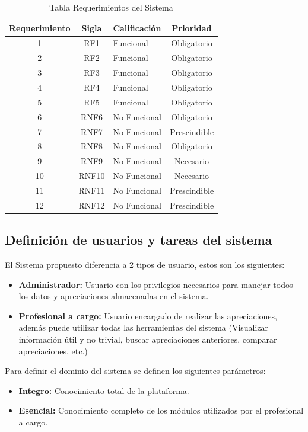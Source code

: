 \begin{table}[h]
\centering
\label{tablareq}
\begin{tabular}{|c|c|l|c|}
	\hline \textbf{Requerimiento} & \textbf{Sigla} & \textbf{Calificación} & \textbf{Prioridad}\\
	\hline 1 & RF1 & Funcional & Obligatorio \\ 
	\hline 2 & RF2 & Funcional & Obligatorio \\ 
	\hline 3 & RF3 & Funcional & Obligatorio \\ 
	\hline 4 & RF4 & Funcional & Obligatorio \\ 
	\hline 5 & RF5 & Funcional & Obligatorio \\ 
	\hline 6 & RNF6 & No Funcional & Obligatorio \\ 
	\hline 7 & RNF7 & No Funcional & Prescindible \\ 
	\hline 8 & RNF8 & No Funcional & Obligatorio \\ 
	\hline 9 & RNF9 & No Funcional & Necesario \\ 
	\hline 10 & RNF10 & No Funcional & Necesario \\ 
	\hline 11 & RNF11 & No Funcional & Prescindible \\ 
	\hline 12 & RNF12 & No Funcional & Prescindible \\
	\hline 
\end{tabular} 
\caption{Tabla Requerimientos del Sistema}
\end{table}

\subsection{Definición de usuarios y tareas del sistema}
El Sistema propuesto diferencia a 2 tipos de usuario, estos son los siguientes: 

\begin{itemize}
	\item \textbf{Administrador:} Usuario con los privilegios necesarios para manejar todos los datos y apreciaciones almacenadas en el sistema.
	\item \textbf{Profesional a cargo:} Usuario encargado de realizar las apreciaciones, además puede utilizar todas las herramientas del sistema (Visualizar información útil y no trivial, buscar apreciaciones anteriores, comparar apreciaciones, etc.)
\end{itemize}
	Para definir el dominio del sistema se definen los siguientes parámetros: 
	
	\begin{itemize}
		\item \textbf{Integro:} Conocimiento total de la plataforma.
		\item \textbf{Esencial:} Conocimiento completo de los módulos utilizados por el profesional a cargo.
	\end{itemize}
	
